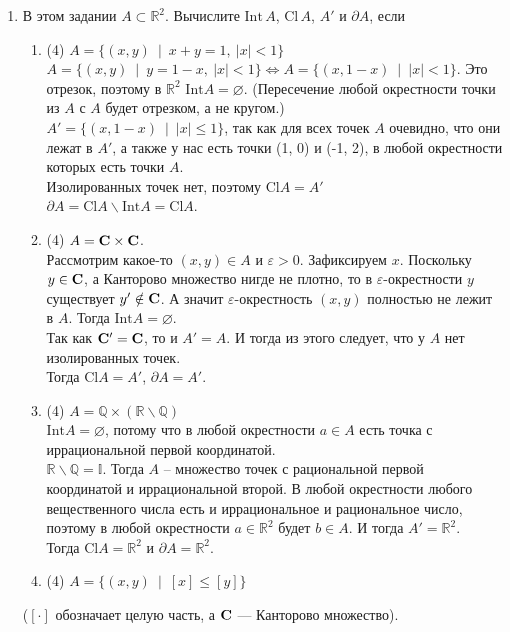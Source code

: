 \documentclass[a4paper]{article}
\def\eps{\varepsilon}
\def\Int{\mathrm{Int}}
\def\Cl{\mathrm{Cl}}
\begin{document}
\begin{enumerate}
    \item В этом задании $A\subset \mathbb R^2$. Вычислите $\Int\,A$, $\Cl\,A$, $A'$ и $\partial A$, если
    \begin{enumerate}
        \item (4) $A = \{ (x,y)\ \mid\ x+y = 1,\ |x|<1 \}$\\
        $A = \{ (x,y)\ \mid\ y = 1-x,\ |x|<1 \} \Leftrightarrow A = \{ (x,1-x)\ \mid\ |x|<1 \}$. Это отрезок, поэтому в $\mathbb R^2$ $\Int A = \varnothing$. (Пересечение любой окрестности точки из $A$ с $A$ будет отрезком, а не кругом.)\\
        $A' = \{ (x,1-x)\ \mid\ |x|\le1 \}$, так как для всех точек $A$ очевидно, что они лежат в $A'$, а также у нас есть точки (1, 0) и (-1, 2), в любой окрестности которых есть точки $A$.\\
        Изолированных точек нет, поэтому $\Cl A = A'$\\
        $\partial A = \Cl A \smallsetminus \Int A = \Cl A$.
        \item (4) $A = \mathrm{\bf C}\times \mathrm{\bf C}$.\\
        Рассмотрим какое-то $(x, y) \in A$ и $\eps > 0$. Зафиксируем $x$. Поскольку $y \in \mathrm{\bf C}$, а Канторово множество нигде не плотно, то в $\eps$-окрестности $y$ существует $y' \notin \mathrm{\bf C}$. А значит $\eps$-окрестность $(x, y)$ полностью не лежит в $A$. Тогда $\Int A = \varnothing$.\\
        Так как $\mathrm{\bf C}' = \mathrm{\bf C}$, то и $A' = A$. И тогда из этого следует, что у $A$ нет изолированных точек.\\
        Тогда $\Cl A = A'$, $\partial A = A'$.
        \item (4) $A = \mathbb Q\times (\mathbb R\smallsetminus \mathbb Q)$\\
        $\Int A = \varnothing$, потому что в любой окрестности $a \in A$ есть точка с иррациональной первой координатой.\\
        $\mathbb R\smallsetminus \mathbb Q = \mathbb I$. Тогда $A$ -- множество точек с рациональной первой координатой и иррациональной второй. В любой окрестности любого вещественного числа есть и иррациональное и рациональное число, поэтому в любой окрестности $a \in \mathbb R^2$ будет $b \in A$. И тогда $A' = \mathbb R^2$.\\
        Тогда $\Cl A = \mathbb R^2$ и $\partial A = \mathbb R^2$.
        \item (4) $A = \{(x,y)\ \mid\ [x] \leq [y]\}$
    \end{enumerate}
    ($[\cdot]$ обозначает целую часть, а $\mathrm{\bf C}$ --- Канторово множество).
    

\end{enumerate}
\end{document}

